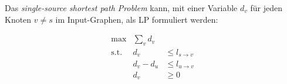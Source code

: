 \documentclass{uebung_cs}
\begin{document}
\begin{aufgabe}
%
%
	Das \emph{single-source shortest path Problem} kann, mit einer Variable $d_v$ für jeden Knoten $v \neq s$ im Input-Graphen, als \acs{LP} formuliert werden:
	
	\[
		\begin{array}{rrl}
			\text{max}   &  \sum_{v} d_v & 	   \\
			\text{s.t.}  &		   d_v & \leq l_{s \rightarrow v} \\
						 &	 d_v - d_u & \leq l_{u \rightarrow v} \\
						 &	       d_v & \geq 0
		\end{array}
	\]
	

\end{aufgabe}
\end{document}
